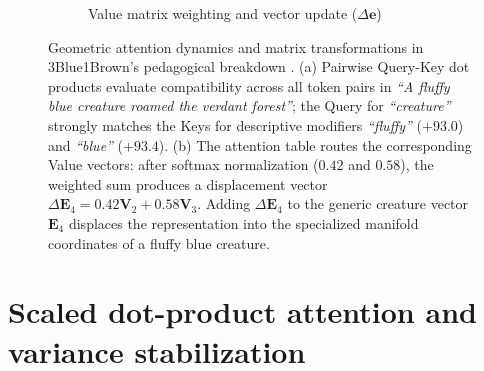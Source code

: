 \documentclass[../../main.tex]{subfiles}
\begin{document}
\begin{figure}[htbp]
\begin{subfigure}[b]{0.48\textwidth}
{%
    }
    \caption{Value matrix weighting and vector update ($\Delta \mathbf{e}$)}
    \label{fig:3b1b_value_table}
\end{subfigure}
\caption{Geometric attention dynamics and matrix transformations in 3Blue1Brown's pedagogical breakdown \cite{sanderson2024attention}. (a) Pairwise Query-Key dot products evaluate compatibility across all token pairs in \emph{``A fluffy blue creature roamed the verdant forest''}; the Query for \emph{``creature''} strongly matches the Keys for descriptive modifiers \emph{``fluffy''} ($+93.0$) and \emph{``blue''} ($+93.4$). (b) The attention table routes the corresponding Value vectors: after softmax normalization ($0.42$ and $0.58$), the weighted sum produces a displacement vector $\Delta \mathbf{E}_4 = 0.42 \mathbf{V}_2 + 0.58 \mathbf{V}_3$. Adding $\Delta \mathbf{E}_4$ to the generic creature vector $\mathbf{E}_4$ displaces the representation into the specialized manifold coordinates of a fluffy blue creature.}
\label{fig:3b1b_query_key_creature}
\end{figure}

\clearpage
\section{Scaled dot-product attention and variance stabilization}
\label{sec:scaled_dot_product_attention}
\end{document}
